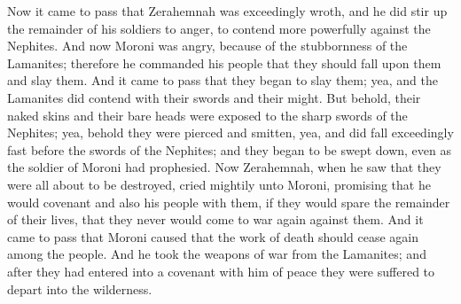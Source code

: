 \bverse \iffalse Now it came to pass that Zerahemnah was exceedingly wroth, and he did stir up the remainder of his soldiers to anger, to contend more powerfully against the Nephites. \fi
Now it came to pass that Zerahemnah was exceedingly wroth, and he did stir up the remainder of his soldiers to anger, to contend more powerfully against the Nephites.
\bverse \iffalse And now Moroni was angry, because of the stubbornness of the Lamanites; therefore he commanded his people that they should fall upon them and slay them. And it came to pass that they began to slay them; yea, and the Lamanites did contend with their swords and their might. \fi
And now Moroni was angry, because of the stubbornness of the Lamanites; therefore he commanded his people that they should fall upon them and slay them. And it came to pass that they began to slay them; yea, and the Lamanites did contend with their swords and their might.
\bverse \iffalse But behold, their naked skins and their bare heads were exposed to the sharp swords of the Nephites; yea, behold they were pierced and smitten, yea, and did fall exceedingly fast before the swords of the Nephites; and they began to be swept down, even as the soldier of Moroni had prophesied. \fi
But behold, their naked skins and their bare heads were exposed to the sharp swords of the Nephites; yea, behold they were pierced and smitten, yea, and did fall exceedingly fast before the swords of the Nephites; and they began to be swept down, even as the soldier of Moroni had prophesied.
\bverse \iffalse Now Zerahemnah, when he saw that they were all about to be destroyed, cried mightily unto Moroni, promising that he would covenant and also his people with them, if they would spare the remainder of their lives, that they never would come to war again against them. \fi
Now Zerahemnah, when he saw that they were all about to be destroyed, cried mightily unto Moroni, promising that he would covenant and also his people with them, if they would spare the remainder of their lives, that they never would come to war again against them.
\bverse \iffalse And it came to pass that Moroni caused that the work of death should cease again among the people. And he took the weapons of war from the Lamanites; and after they had entered into a covenant with him of peace they were suffered to depart into the wilderness. \fi
And it came to pass that Moroni caused that the work of death should cease again among the people. And he took the weapons of war from the Lamanites; and after they had entered into a covenant with him of peace they were suffered to depart into the wilderness.
